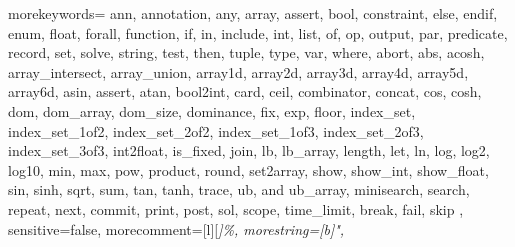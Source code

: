 

{
morekeywords={
ann, annotation, any, array, assert, bool, constraint, else, endif, enum, float, forall, function,
if, in, include, int, list, of, op, output, par, predicate, record, set,
solve, string, test, then, tuple, type, var, where,
abort, abs, acosh, array_intersect, array_union,
array1d, array2d, array3d, array4d, array5d, array6d, asin, assert, atan, bool2int, card,
ceil, combinator, concat, cos, cosh, dom, dom_array, dom_size, dominance,
fix, exp, floor, index_set, index_set_1of2,
index_set_2of2, index_set_1of3, index_set_2of3, index_set_3of3, int2float, is_fixed,
join, lb, lb_array, length, let, ln, log, log2, log10, min, max, pow, product, round, set2array,
show, show_int, show_float, sin, sinh, sqrt, sum, tan, tanh, trace, ub, and ub_array,
minisearch, search, repeat, next, commit, print, post, sol, scope, time_limit, break, fail, skip
},
sensitive=false, %
morecomment=[l][\em\color{ForestGreen}]{\%},
morestring=[b]",
}

